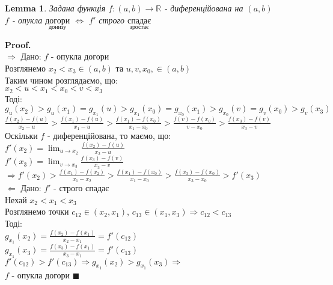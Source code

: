 \documentclass[a4paper, 14pt]{extarticle}
\def\huge{\displaystyle}
\def\bigline{\vspace{5mm}\\}
\def\rightproof{$\boxed{\Rightarrow}$ }
\def\leftproof{$\boxed{\Leftarrow}$ }
\theoremstyle{theoremdd}
\theoremstyle{theoremdd}
\theoremstyle{theoremdd}
\theoremstyle{theoremdd}
\theoremstyle{theoremdd}
\theoremstyle{theoremdd}
\theoremstyle{theoremdd}
\newtheorem{lemma}[theorem]{Lemma}
\theoremstyle{theoremdd}
\newenvironment{pf}{\vspace*{-3mm} \textbf{Proof. \\}}{$\blacksquare$}
\begin{document}
\begin{lemma}
Задана функція $f: (a,b) \to \mathbb{R}$ - диференційована на $(a,b)$\\
$f$ - опукла $\underset{\textrm{донизу}}{\textrm{догори}}$ $\iff$ $f'$ строго $\underset{\textrm{зростає}}{\textrm{спадає}}$
\end{lemma}
\begin{pf}
\rightproof Дано: $f$ - опукла догори\\
Розглянемо $x_2 < x_3 \in (a,b)$ та $u,v,x_0, \in (a,b)$\\
Таким чином розглядаємо, що:\\
$x_2 < u < x_1 < x_0 < v < x_3$\\
Тоді: \\ $g_u(x_2) > g_u(x_1) = g_{x_1}(u) > g_{x_1}(x_0) = g_{x_0}(x_1) > g_{x_0}(v) = g_v(x_0) > g_v(x_3)$\\
$\huge \frac{f(x_2)-f(u)}{x_2-u} > \frac{f(x_1)-f(u)}{x_1-u} > \frac{f(x_1)-f(x_0)}{x_1-x_0} > \frac{f(v)-f(x_0)}{v-x_0} > \frac{f(x_3)-f(v)}{x_3-v}$\\
Оскільки $f$ - диференційована, то маємо, що:\\
$\huge f'(x_2) = \lim_{u \to x_2} \frac{f(x_2)-f(u)}{x_2-u}$\\
$\huge f'(x_3) = \lim_{v \to x_3} \frac{f(x_3)-f(v)}{x_3-v}$\\
$\Rightarrow \huge f'(x_2) > \frac{f(x_1)-f(x_2)}{x_1-x_2} > \frac{f(x_1)-f(x_0)}{x_1-x_0} > \frac{f(x_3)-f(x_0)}{x_3-x_0} > f'(x_3)$
\bigline
\leftproof Дано: $f'$ - строго спадає\\
Нехай $x_2 < x_1 < x_3$\\
Розглянемо точки $c_{12} \in (x_2,x_1)$, $c_{13} \in (x_1,x_3) \Rightarrow c_{12} < c_{13}$\\
Тоді:\\
$g_{x_1}(x_2) \huge = \frac{f(x_2)-f(x_1)}{x_2-x_1} = f'(c_{12})$\\
$g_{x_1}(x_3) \huge = \frac{f(x_3)-f(x_1)}{x_3-x_1} = f'(c_{13})$\\
$f'(c_{12}) > f'(c_{13}) \Rightarrow g_{x_1}(x_2) > g_{x_1}(x_3) \Rightarrow$\\
$f$ - опукла догори
\end{pf}
\end{document}
